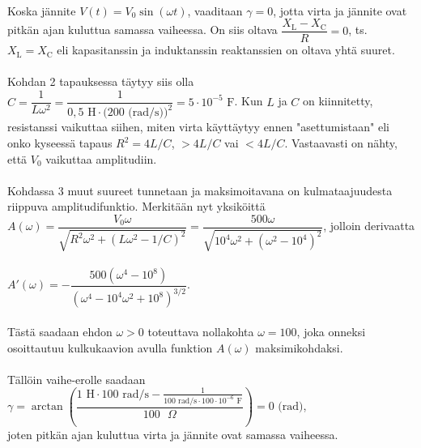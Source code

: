 \documentclass[12pt,fleqn]{article}
\begin{document}
\begin{enumerate}[label=\textbf{\arabic*.}]
 \\
Koska jännite \(V(t)=V_0 \sin (\omega t)\), vaaditaan \(\gamma =0\), jotta virta ja jännite ovat pitkän ajan kuluttua samassa vaiheessa. On siis oltava \(\dfrac{X_\text{L}-X_\text{C}}{R}=0\), ts. \(X_\text{L}=X_\text{C}\) eli kapasitanssin ja induktanssin reaktanssien on oltava yhtä suuret.\\
 \\
Kohdan 2 tapauksessa täytyy siis olla \(C=\dfrac{1}{L\omega ^2}=\dfrac{1}{0,5\text{ H}\cdot (200\text{ (rad/s))}^2}=5\cdot 10^{-5}\text{ F}\). Kun \(L\) ja \(C\) on kiinnitetty, resistanssi vaikuttaa siihen, miten virta käyttäytyy ennen "asettumistaan" eli onko kyseessä tapaus \(R^2=4L/C\), \(>4L/C\) vai \(<4L/C\). Vastaavasti on nähty, että \(V_0\) vaikuttaa amplitudiin.\\
 \\
Kohdassa 3 muut suureet tunnetaan ja maksimoitavana on kulmataajuudesta riippuva amplitudifunktio. Merkitään nyt yksiköittä \(A(\omega )=\dfrac{V_0 \omega}{\sqrt{R^2\omega ^2+(L\omega ^2-1/C)^2}}=\dfrac{500\omega}{\sqrt{10^4 \omega^2+(\omega^2-10^4)^2}}\), jolloin derivaatta\\ \\ \(A'(\omega)=-\dfrac{500(\omega^4-10^8)}{(\omega^4-10^4 \omega^2+10^8)^{3/2}}\).\\ \\ Tästä saadaan ehdon \(\omega >0\) toteuttava nollakohta \(\omega =100\), joka onneksi osoittautuu kulkukaavion avulla funktion \(A(\omega)\) maksimikohdaksi.\\
 \\
Tällöin vaihe-erolle saadaan \(\gamma =\arctan \left ( \dfrac{1\text{ H}\cdot 100\text{ rad/s}-\frac{1}{100\text{ rad/s}\cdot 100\cdot 10^{-6}\text{ F}}}{100\text{ }\Omega}\right )=0\text{ (rad)}\),\\ joten pitkän ajan kuluttua virta ja jännite ovat samassa vaiheessa.

\end{enumerate}

\newpage
\end{document}
